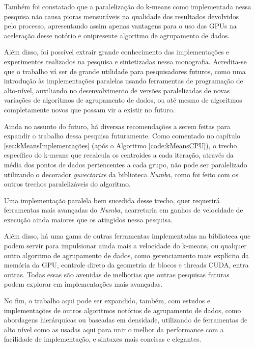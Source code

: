 \documentclass[12pt,
openright, 
oneside, %
a4paper,    %
brazil]{facom-ufu-abntex2}
\begin{document}
Também foi constatado que a paralelização do k-means como implementada nessa pesquisa não causa pioras mensuráveis na qualidade dos resultados devolvidos pelo processo, apresentando assim apenas vantagens para o uso das GPUs na aceleração desse notório e onipresente algoritmo de agrupamento de dados.

Além disso, foi possível extrair grande conhecimento das implementações e experimentos realizados na pesquisa e sintetizadas nessa monografia. Acredita-se que o trabalho vá ser de grande utilidade para pesquisadores futuros, como uma introdução às implementações paralelas usando ferramentas de programação de alto-nível, auxiliando no desenvolvimento de versões paralelizadas de novas variações de algoritmos de agrupamento de dados, ou até mesmo de algoritmos completamente novos que possam vir a existir no futuro.

Ainda no assunto do futuro, há diversas recomendações a serem feitas para expandir o trabalho dessa pesquisa futuramente. Como comentado no capítulo \ref{sec:kMeansImplementações} (após o Algoritmo \ref{code:kMeansCPU}), o trecho específico do k-means que recalcula os centroides a cada iteração, através da média dos pontos de dados pertencentes a cada grupo, não pode ser paralelizado utilizando o decorador \textit{guvectorize} da biblioteca \textit{Numba}, como foi feito com os outros trechos paralelizáveis do algoritmo.

Uma implementação paralela bem sucedida desse trecho, quer requerirá ferramentas mais avançadas do \textit{Numba}, acarretaria em ganhos de velocidade de execução ainda maiores que os atingidos nessa pesquisa.

Além disso, há uma gama de outras ferramentas implementadas na biblioteca que podem servir para impulsionar ainda mais a velocidade do k-means, ou qualquer outro algoritmo de agrupamento de dados, como gerenciamento mais explícito da memória da GPU, controle direto da geometria de blocos e threads CUDA, entra outras. Todas essas são avenidas de melhorias que outras pesquisas futuras podem explorar em implementações mais avançadas.

No fim, o trabalho aqui pode ser expandido, também, com estudos e implementações de outros algoritmos notórios de agrupamento de dados, como abordagens hierárquicas ou baseadas em densidade, utilizando de ferramentas de alto nível como as usadas aqui para unir o melhor da performance com a facilidade de implementação, e sintaxes mais concisas e elegantes.
\end{document}
